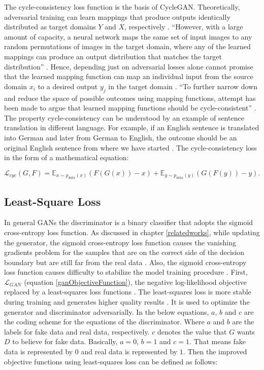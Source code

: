 The cycle-consistency loss function is the basis of \ac{CycleGAN}. Theoretically, adversarial training can learn mappings that produce outputs identically distributed as target domains $Y$ and $X$, respectively \cite{goodfellow2017nips}. ``However, with a large amount of capacity, a neural network maps the same set of input images to any random permutations of images in the target domain, where any of the learned mappings can produce an output distribution that matches the target distribution'' \cite{goodfellow2017nips}. Hence, depending just on adversarial losses alone cannot promise that the learned mapping function can map an individual input from the source domain $x_i$ to a desired output $y_j$ in the target domain \cite{goodfellow2017nips}. ``To further narrow down and reduce the space of possible outcomes using mapping functions, attempt has been made to argue that learned mapping functions should be cycle-consistent'' \cite{zhu2020unpaired}. The property cycle-consistency can be understood by an example of sentence translation in different language. For example, if an English sentence is translated into German and later from German to English, the outcome should be an original English sentence from where we have started \cite{goodfellow2017nips}. The cycle-consistency loss in the form of a mathematical equation:

\begin{equation}\label{CycleConsistencyLossEquation}
    \mathcal{L}_{cyc}(G, F) = \mathbb{E}_{x \sim p_{data}(x)} (F(G(x)) - x) + \mathbb{E}_{y \sim p_{data}(y)} (G(F(y)) - y).
\end{equation}


\subsection{Least-Square Loss}

In general \acp{GAN} the discriminator is a binary classifier that adopts the sigmoid cross-entropy loss function. As discussed in chapter \ref{relatedworks}, while updating the generator, the sigmoid cross-entropy loss function causes the vanishing gradients problem for the samples that are on the correct side of the decision boundary but are still far from the real data \cite{mao2017squares}.  Also, the sigmoid cross-entropy loss function causes difficulty to stabilize the model training procedure \cite{mao2017squares}. First, $\mathcal{L}_{GAN}$ (equation \ref{ganObjectiveFunction}), the negative log-likelihood objective replaced by a least-squares loss functions \cite{mao2017squares}. The least-squares loss is more stable during training and generates higher quality results \cite{mao2017squares}. It is used to optimize the generator and discriminator adversarially. In the below equations, $a$, $b$ and $c$ are the coding scheme for the equations of the discriminator. Where $a$ and $b$ are the labels for fake data and real data, respectively. $c$ denotes the value that $G$ wants $D$ to believe for fake data. Basically, $a = 0$, $b = 1$ and $c = 1$. That means fake data is represented by $0$ and real data is represented by $1$. Then the improved objective functions using least-squares loss can be defined as follows:

